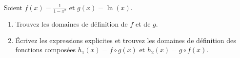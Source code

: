 
\begin{exercice}\label{exoDS2010bis-0001}

Soient $\displaystyle f(x)= \frac{1}{1-x^2}$ et $\displaystyle g(x)=\ln(x)$. 

\begin{enumerate}
\item Trouvez les domaines de définition de $f$ et de $g$.
\item Écrivez les expressions explicites et trouvez les domaines de définition des fonctions composées $h_1 (x) = f\circ g (x)$ et $h_2(x)=g\circ f (x)$.
\end{enumerate}
 

\end{exercice}

